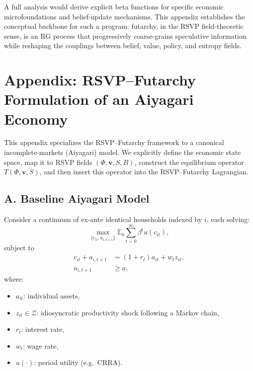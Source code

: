 \documentclass[12pt]{article}
\begin{document}
A full analysis would derive explicit beta functions for specific
economic microfoundations and belief-update mechanisms. This appendix
establishes the conceptual backbone for such a program: futarchy, in
the RSVP field-theoretic sense, is an RG process that progressively
coarse-grains speculative information while reshaping the couplings
between belief, value, policy, and entropy fields.


\section*{Appendix: RSVP--Futarchy Formulation of an Aiyagari Economy}

This appendix specializes the RSVP--Futarchy framework to a canonical
incomplete-markets (Aiyagari) model. We explicitly define the economic
state space, map it to RSVP fields $(\Phi,\mathbf{v},S,B)$, construct
the equilibrium operator $T(\Phi,\mathbf{v},S)$, and then insert this
operator into the RSVP--Futarchy Lagrangian.

\subsection*{A. Baseline Aiyagari Model}

Consider a continuum of ex-ante identical households indexed by $i$,
each solving:
\[
\max_{\{c_{it},a_{i,t+1}\}}
\mathbb{E}_0 \sum_{t=0}^{\infty} \beta^t u(c_{it}),
\]
subject to
\begin{align}
c_{it} + a_{i,t+1} &= (1+r_t)a_{it} + w_t z_{it},\\
a_{i,t+1} &\ge \underline{a},
\end{align}
where:
\begin{itemize}
    \item $a_{it}$: individual assets,
    \item $z_{it} \in \mathcal{Z}$: idiosyncratic productivity shock following a Markov chain,
    \item $r_t$: interest rate,
    \item $w_t$: wage rate,
    \item $u(\cdot)$: period utility (e.g.\ CRRA).
\end{itemize}
\end{document}
